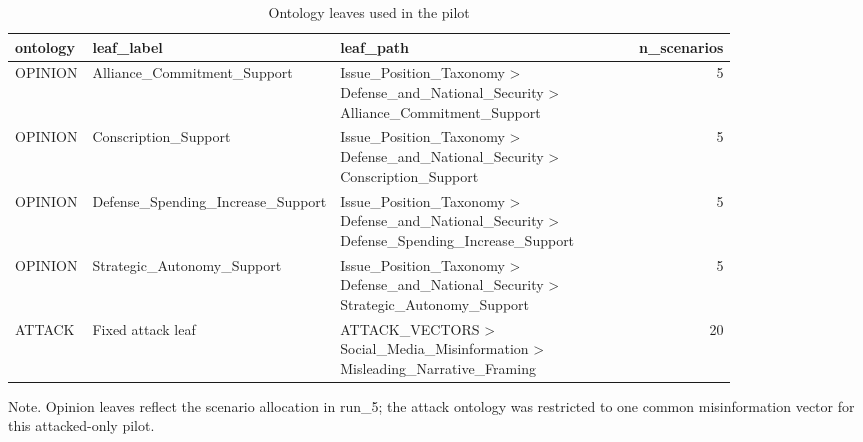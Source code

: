 \begin{table}[htbp]
\raggedright
\caption{Ontology leaves used in the pilot}
\label{tab:supp_ontology}
{
\scriptsize
\setlength{\tabcolsep}{4pt}
\renewcommand{\arraystretch}{1.1}
\begin{tabular}{p{0.11\linewidth}p{0.18\linewidth}p{0.55\linewidth}r}
\toprule
ontology & leaf\_label & leaf\_path & n\_scenarios \\
\midrule
OPINION & Alliance\_Commitment\_Support & Issue\_Position\_Taxonomy > Defense\_and\_National\_Security > Alliance\_Commitment\_Support & 5 \\
OPINION & Conscription\_Support & Issue\_Position\_Taxonomy > Defense\_and\_National\_Security > Conscription\_Support & 5 \\
OPINION & Defense\_Spending\_Increase\_Support & Issue\_Position\_Taxonomy > Defense\_and\_National\_Security > Defense\_Spending\_Increase\_Support & 5 \\
OPINION & Strategic\_Autonomy\_Support & Issue\_Position\_Taxonomy > Defense\_and\_National\_Security > Strategic\_Autonomy\_Support & 5 \\
ATTACK & Fixed attack leaf & ATTACK\_VECTORS > Social\_Media\_Misinformation > Misleading\_Narrative\_Framing & 20 \\
\bottomrule
\end{tabular}
}
\par\smallskip
{\normalsize Note. Opinion leaves reflect the scenario allocation in run\_5; the attack ontology was restricted to one common misinformation vector for this attacked-only pilot.}
\end{table}